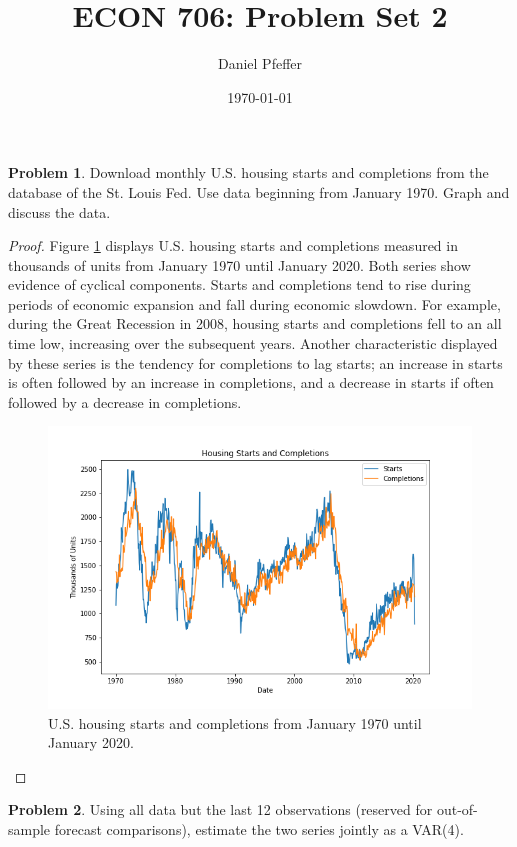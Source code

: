 \documentclass[oneside,reqno]{amsart}
\title{ECON 706: Problem Set 2}
\author{Daniel Pfeffer}
\date{\today}
\theoremstyle{definition}
\newtheorem{prob}{Problem}
\begin{document}
\maketitle

\begin{prob}
Download monthly U.S. housing starts and completions from the database of the St. Louis Fed. Use data beginning from January 1970. Graph and discuss the data.
\end{prob}

\begin{proof}
Figure \ref{plot-series} displays U.S. housing starts and completions measured in thousands of units from January 1970 until January 2020. Both series show evidence of cyclical components. Starts and completions tend to rise during periods of economic expansion and fall during economic slowdown. For example, during the Great Recession in 2008, housing starts and completions fell to an all time low, increasing over the subsequent years. Another characteristic displayed by these series is the tendency for completions to lag starts; an increase in starts is often followed by an increase in completions, and a decrease in starts if often followed by a decrease in completions.
\begin{figure}
\includegraphics[width=\textwidth]{plot-series}
\caption{U.S. housing starts and completions from January 1970 until January 2020.}
\label{plot-series}
\end{figure}
\end{proof}

\begin{prob}
Using all data but the last 12 observations (reserved for out-of-sample forecast comparisons), estimate the two series jointly as a VAR(4).
\end{prob}
\end{document}
